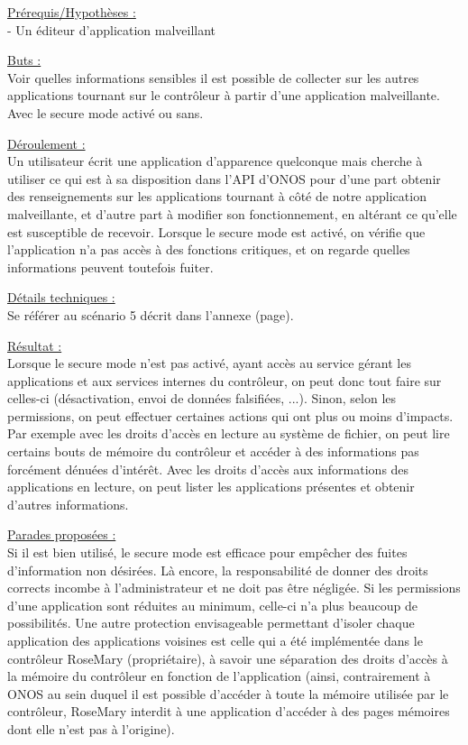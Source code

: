 \underline{Prérequis/Hypothèses :}\\
- Un éditeur d’application malveillant


\underline{Buts :}\\
Voir quelles informations sensibles il est possible de collecter sur les autres applications tournant sur le contrôleur à partir d’une application malveillante. Avec le secure mode activé ou sans.

\underline{Déroulement :}\\
Un utilisateur écrit une application d’apparence quelconque mais cherche à utiliser ce qui est à sa disposition dans l’API d’ONOS pour d’une part obtenir des renseignements sur les applications tournant à côté de notre application malveillante, et d’autre part à modifier son fonctionnement, en altérant ce qu’elle est susceptible de recevoir. Lorsque le secure mode est activé, on vérifie que l’application n’a pas accès à des fonctions critiques, et on regarde quelles informations peuvent toutefois fuiter.

\underline{Détails techniques :}\\
Se référer au scénario 5 décrit dans l'annexe (page).

\underline{Résultat :}\\
Lorsque le secure mode n'est pas activé, ayant accès au service gérant les applications et aux services internes du contrôleur, on peut donc tout faire sur celles-ci (désactivation, envoi de données falsifiées, ...). Sinon, selon les permissions, on peut effectuer certaines actions qui ont plus ou moins d'impacts. Par exemple avec les droits d'accès en lecture au système de fichier, on peut lire certains bouts de mémoire du contrôleur et accéder à des informations pas forcément dénuées d'intérêt. Avec les droits d'accès aux informations des applications en lecture, on peut lister les applications présentes et obtenir d'autres informations.

\underline{Parades proposées :}\\
Si il est bien utilisé, le secure mode est efficace pour empêcher des fuites d'information non désirées. Là encore, la responsabilité de donner des droits corrects incombe à l'administrateur et ne doit pas être négligée. Si les permissions d'une application sont réduites au minimum, celle-ci n'a plus beaucoup de possibilités. Une autre protection envisageable permettant d'isoler chaque application des applications voisines est celle qui a été implémentée dans le contrôleur RoseMary (propriétaire), à savoir une séparation des droits d'accès à la mémoire du contrôleur en fonction de l'application (ainsi, contrairement à ONOS au sein duquel il est possible d'accéder à toute la mémoire utilisée par le contrôleur, RoseMary interdit à une application d'accéder à des pages mémoires dont elle n'est pas à l'origine).

